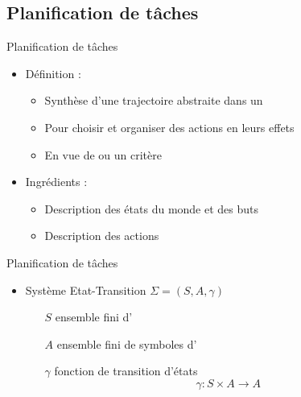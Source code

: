 \documentclass[compress]{beamer}
\begin{document}
\subsection{Planification de tâches}
\begin{frame}{Planification de tâches}
\begin{itemize}
\item Définition :
	\begin{itemize}
	\item Synthèse d'une trajectoire abstraite dans un 
	\item Pour choisir et organiser des actions en  leurs effets
	\item En vue de  ou un critère
	\end{itemize}
\item Ingrédients :
	\begin{itemize}
	\item Description des états du monde et des buts
	\item Description des actions
	\end{itemize}
\end{itemize}
\end{frame}

\begin{frame}{Planification de tâches}
\begin{itemize}
\item Système Etat-Transition $\Sigma = (S,A,\gamma)$
	\begin{itemize}
	\item[$S$] ensemble fini d'
	\item[$A$] ensemble fini de symboles d'
	\item[$\gamma$] fonction de transition d'états
		$$\gamma: S \times A \rightarrow A$$
	\end{itemize}
\end{itemize}
\end{frame}
\end{document}
